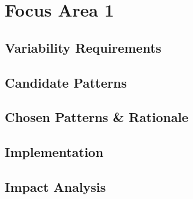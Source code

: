 \section{Focus Area 1}\label{sec:focus_area_1}

\subsection{Variability Requirements}\label{sec:variability_requirements_1}

\subsection{Candidate Patterns}\label{sec:candidate_patterns_1}

\subsection{Chosen Patterns \& Rationale}\label{sec:chosen_patterns_rationale_1}

\subsection{Implementation}\label{sec:implementation_1}

\subsection{Impact Analysis}\label{sec:impact_analysis_1}
